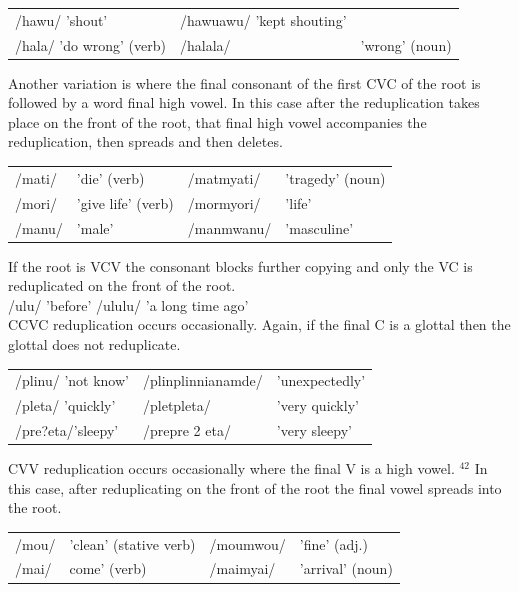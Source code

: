 \documentclass[10pt]{article}
\begin{document}
\begin{center}
\begin{tabular}{lll}
/hawu/ 'shout' & /hawuawu/ 'kept shouting' &  \\
/hala/ 'do wrong' (verb) & /halala/ & 'wrong' (noun) \\
\end{tabular}
\end{center}

Another variation is where the final consonant of the first CVC of the root is followed by a word final high vowel. In this case after the reduplication takes place on the front of the root, that final high vowel accompanies the reduplication, then spreads and then deletes.

\begin{center}
\begin{tabular}{llll}
/mati/ & 'die' (verb) & /matmyati/ & 'tragedy' (noun) \\
/mori/ & 'give life' (verb) & /mormyori/ & 'life' \\
/manu/ & 'male' & /manmwanu/ & 'masculine' \\
\end{tabular}
\end{center}

If the root is VCV the consonant blocks further copying and only the VC is reduplicated on the front of the root.\\
/ulu/ 'before' /ululu/ 'a long time ago'\\
CCVC reduplication occurs occasionally. Again, if the final C is a glottal then the glottal does not reduplicate.

\begin{center}
\begin{tabular}{lll}
/plinu/ 'not know' & /plinplinnianamde/ & 'unexpectedly' \\
/pleta/ 'quickly' & /pletpleta/ & 'very quickly' \\
/pre?eta/'sleepy' & /prepre 2 eta/ & 'very sleepy' \\
\end{tabular}
\end{center}

CVV reduplication occurs occasionally where the final V is a high vowel. \({ }^{42}\) In this case, after reduplicating on the front of the root the final vowel spreads into the root.

\begin{center}
\begin{tabular}{llll}
/mou/ & 'clean' (stative verb) & /moumwou/ & 'fine' (adj.) \\
/mai/ & come' (verb) & /maimyai/ & 'arrival' (noun) \\
\end{tabular}
\end{center}
\end{document}
